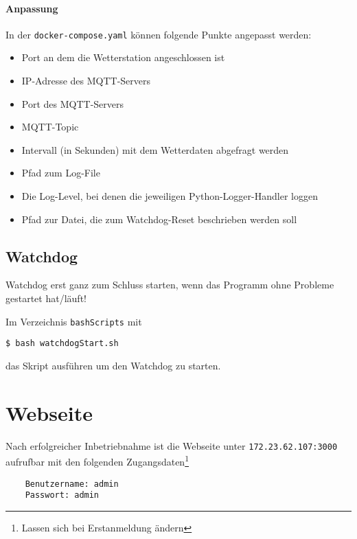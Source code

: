 \paragraph{Anpassung}
In der \verb|docker-compose.yaml| können folgende Punkte angepasst werden:
\begin{itemize}
	\item Port an dem die Wetterstation angeschlossen ist
	\item IP-Adresse des MQTT-Servers
	\item Port des MQTT-Servers
	\item MQTT-Topic
	\item Intervall (in Sekunden) mit dem Wetterdaten abgefragt werden
	\item Pfad zum Log-File
	\item Die Log-Level, bei denen die jeweiligen Python-Logger-Handler loggen
	\item Pfad zur Datei, die zum Watchdog-Reset beschrieben werden soll
\end{itemize} 

\subsection{Watchdog}
Watchdog erst ganz zum Schluss starten, wenn das Programm ohne Probleme gestartet hat/läuft!

Im Verzeichnis \verb|bashScripts| mit 
\begin{verbatim}
$ bash watchdogStart.sh
\end{verbatim}
das Skript ausführen um den Watchdog zu starten.


\section{Webseite}
Nach erfolgreicher Inbetriebnahme ist die Webseite unter \texttt{172.23.62.107:3000} aufrufbar mit den folgenden Zugangsdaten\footnote{Lassen sich bei Erstanmeldung ändern}

\begin{verbatim}
	Benutzername: admin
	Passwort: admin
\end{verbatim}
